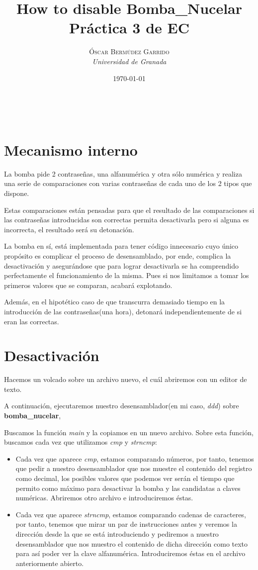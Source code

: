 \documentclass[a4paper, 11pt]{article}
\title{\textbf{How to disable Bomba\_Nucelar}\\ %
Práctica 3 de EC} %
\author{\textsc{Óscar Bermúdez Garrido} %
\\{\textit{Universidad de Granada}}} %
\date{\today} %
\makeatletter
\renewcommand{\maketitle}{
  \begin{flushright} %
  
  {\LARGE\@title} %
  
  \vspace{50pt} %
  
  {\large\@author} %
  \\\@date %
  \vspace{40pt} %
  \end{flushright}
}
\makeatother
\begin{document}
\maketitle %


	\section{Mecanismo interno}
		La bomba pide 2 contraseñas, una alfanumérica y otra sólo numérica y realiza una serie de comparaciones
		con varias contraseñas de cada uno de los 2 tipos que dispone.
		
		Estas comparaciones están pensadas para que el resultado de las comparaciones si las contraseñas
		introducidas son correctas permita desactivarla pero si alguna es incorrecta, el resultado será su
		detonación.
		
		La bomba en sí, está implementada para tener código innecesario cuyo único propósito es complicar el
		proceso de desensamblado, por ende, complica la desactivación y asegurándose que para lograr desactivarla
		se ha comprendido perfectamente el funcionamiento de la misma. Pues si nos limitamos a tomar los primeros
		valores que se comparan, acabará explotando.
		
		Además, en el hipotético caso de que transcurra demasiado tiempo en la introducción de las
		contraseñas(una hora), detonará independientemente de si eran las correctas.

	\section{Desactivación}
		Hacemos un volcado sobre un archivo nuevo, el cuál abriremos con un editor de texto.
		
		A continuación, ejecutaremos nuestro desensamblador(en mi caso, \textit{ddd}) sobre \textbf{bomba\_nucelar},
		
		Buscamos la función \textit{main} y la copiamos en un nuevo archivo. Sobre esta función, buscamos cada
		vez que utilizamos \textit{cmp} y \textit{strncmp}:
		
		\begin{itemize}
			\item Cada vez que aparece \textit{cmp}, estamos comparando números, por tanto, tenemos que pedir a
			nuestro desensamblador que nos muestre el contenido del registro como decimal, los posibles valores
			que podemos ver serán el tiempo que permito como máximo para desactivar la bomba y las candidatas a
			claves numéricas. Abriremos otro archivo e introduciremos éstas.

			\item Cada vez que aparece \textit{strncmp}, estamos comparando cadenas de caracteres, por tanto,
			tenemos que mirar un par de instrucciones antes y veremos la dirección desde la que se está introduciendo
			y pediremos a nuestro desensamblador que nos muestro el contenido de dicha dirección como texto para
			así poder ver la clave alfanumérica. Introduciremos éstas en el archivo anteriormente abierto.
		\end{itemize}
\end{document}
